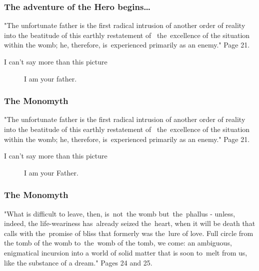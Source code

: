 \documentclass[10pt,t]{beamer}
\begin{document}
\begin{frame}
  \frametitle{The adventure of the Hero begins\ldots}


  "The unfortunate father is the first radical intrusion of another
  order of reality into the beatitude of this earthly restatement
  of~ the~excellence of the situation within the womb; he,
  therefore, is~experienced primarily as an enemy." Page 21.

  I can't say more than this picture


  \begin{figure}
    \centering

    I am your father.

  \end{figure}

\end{frame}





\begin{frame}
  \frametitle{The Monomyth}


  "The unfortunate father is the first radical intrusion of another
  order of reality into the beatitude of this earthly restatement
  of~ the~excellence of the situation within the womb; he,
  therefore, is~experienced primarily as an enemy." Page 21.

  I can't say more than this picture


  \begin{figure}

    \centering

    I am your Father.

  \end{figure}

\end{frame}





\begin{frame}
  \frametitle{The Monomyth}


  "What is difficult to leave, then, is~not~the womb but~the~phallus
  - unless, indeed, the life-weariness has~already seized the~heart,
  when it will be death that calls with the~promise of bliss that
  formerly was the~lure of love. Full circle from the tomb of the
  womb to~the~womb of the tomb, we come: an ambiguous, enigmatical
  incursion into a world of solid matter that is soon to~melt from
  us, like the substance of a dream." Pages 24 and 25.

\end{frame}
\end{document}
